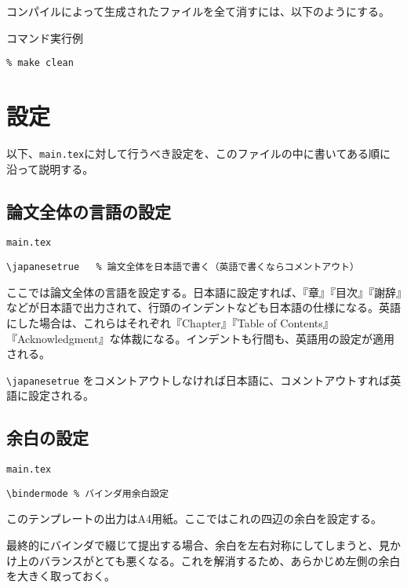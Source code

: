 コンパイルによって生成されたファイルを全て消すには、以下のようにする。

\begin{itembox}[l]{コマンド実行例}
\begin{verbatim}
% make clean
\end{verbatim}
\end{itembox}

\section{設定}

以下、{\tt main.tex}に対して行うべき設定を、このファイルの中に書いてある順に沿って説明する。

\subsection{論文全体の言語の設定}
\label{sec:lang}

\begin{itembox}[l]{{\tt main.tex}}
\begin{verbatim}
\japanesetrue	% 論文全体を日本語で書く（英語で書くならコメントアウト）
\end{verbatim}
\end{itembox}

ここでは論文全体の言語を設定する。日本語に設定すれば、『章』『目次』『謝辞』などが日本語で出力されて、行頭のインデントなども日本語の仕様になる。英語にした場合は、これらはそれぞれ『Chapter』『Table of Contents』『Acknowledgment』な体裁になる。インデントも行間も、英語用の設定が適用される。

\verb|\japanesetrue| をコメントアウトしなければ日本語に、コメントアウトすれば英語に設定される。


\subsection{余白の設定}

\begin{itembox}[l]{{\tt main.tex}}
\begin{verbatim}
\bindermode	% バインダ用余白設定
\end{verbatim}
\end{itembox}

このテンプレートの出力はA4用紙。ここではこれの四辺の余白を設定する。

最終的にバインダで綴じて提出する場合、余白を左右対称にしてしまうと、見かけ上のバランスがとても悪くなる。これを解消するため、あらかじめ左側の余白を大きく取っておく。

